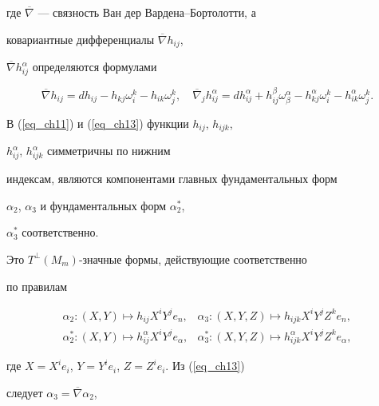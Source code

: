 где $\overline{\nabla}$ --- связность Ван дер Вардена--Бортолотти, а


ковариантные дифференциалы $\overline{\nabla}h_{ij}$,


$\overline{\nabla}h^{\alpha}_{ij}$ определяются формулами


\begin{equation}


\label{eq_ch14}


\overline{\nabla}h_{ij}=dh_{ij}-h_{kj}\omega^k_i-h_{ik}\omega^k_j,\quad


\overline{\nabla}_jh^{\alpha}_{ij}=dh^{\alpha}_{ij}+


h^{\beta}_{ij}\omega^{\alpha}_{\beta}- h^{\alpha}_{kj}\omega^k_i-


h^{\alpha}_{ik}\omega^k_j .


\end{equation}


В (\ref{eq_ch11}) и (\ref{eq_ch13}) функции $h_{ij}$, $h_{ijk}$,


$h^{\alpha}_{ij}$, $h^{\alpha}_{ijk}$ симметричны по нижним


индексам, являются компонентами главных фундаментальных форм


$\alpha_2$, $\alpha_3$ и фундаментальных форм $\alpha^*_2$,


$\alpha^*_3$ соответственно.


Это $T^{\perp}(M_m)$-значные формы, действующие соответственно


по правилам


\begin{equation}


\label{eq_ch15}


\begin{array}{ll}


\alpha_2:(X, Y)\longmapsto h_{ij}X^iY^je_n,& \alpha_3:


(X, Y, Z)\longmapsto h_{ijk}X^iY^jZ^ke_n,\\[2mm]


\alpha_2^*:(X, Y)\longmapsto h^{\alpha}_{ij}X^iY^je_{\alpha},& \alpha^*_3:


(X, Y, Z)\longmapsto h^{\alpha}_{ijk}X^iY^jZ^ke_{\alpha} ,


\end{array}


\end{equation}


где $X=X^ie_i$, $Y=Y^ie_i$, $Z=Z^ie_i$. Из (\ref{eq_ch13})


следует $\alpha_3=\overline{\nabla}\alpha_2$,


